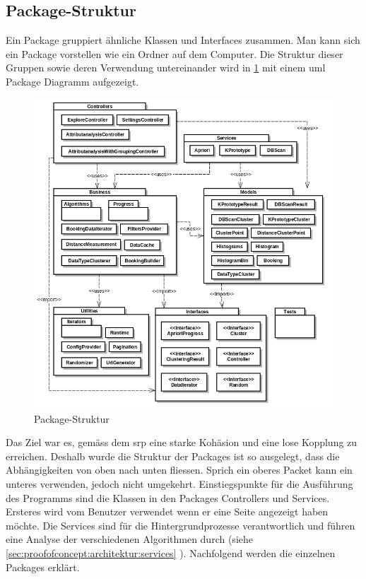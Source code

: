\subsection{Package-Struktur}
\label{sec:proofofconcept:packagestruktur}
Ein Package gruppiert ähnliche Klassen und Interfaces zusammen. Man kann sich ein Package vorstellen wie ein Ordner auf dem Computer. Die Struktur dieser Gruppen sowie deren Verwendung untereinander wird in \cref{fig:proofofconcept:packagestruktur:1} mit einem \gls{uml} Package Diagramm aufgezeigt. 
\begin{figure}[H]
	\RawFloats
	\centering
	\includegraphics[width=1\textwidth]{images/diagram-package-diagram}
	\caption{Package-Struktur}
	\label{fig:proofofconcept:packagestruktur:1}
\end{figure}

Das Ziel war es, gemäss dem \gls{srp} eine starke Kohäsion und eine lose Kopplung zu erreichen. Deshalb wurde die Struktur der Packages ist so ausgelegt, dass die Abhängigkeiten von oben nach unten fliessen. Sprich ein oberes Packet kann ein unteres verwenden, jedoch nicht umgekehrt. Einstiegspunkte für die Ausführung des Programms sind die Klassen in den Packages Controllers und Services. Ersteres wird vom Benutzer verwendet wenn er eine Seite angezeigt haben möchte. Die Services sind für die Hintergrundprozesse verantwortlich und führen eine Analyse der verschiedenen Algorithmen durch (siehe \cref{sec:proofofconcept:architektur:services} ). Nachfolgend werden die einzelnen Packages erklärt.

